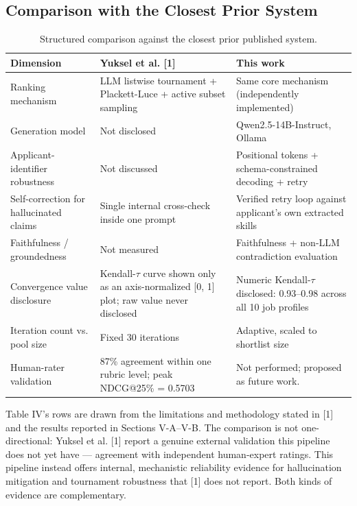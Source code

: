 \documentclass[journal]{IEEEtran}
\begin{document}
\subsection{Comparison with the Closest Prior System}
\begin{table}[!t]
\caption{Structured comparison against the closest prior published system.}
\label{tab_comparison}
\centering
\footnotesize
\begin{tabular}{p{1.5in}p{2.5in}p{2.5in}}
\hline
Dimension & Yuksel et al. [1] & This work\\
\hline
Ranking mechanism & LLM listwise tournament + Plackett-Luce + active subset sampling & Same core mechanism (independently implemented)\\
Generation model & Not disclosed & Qwen2.5-14B-Instruct, Ollama\\
Applicant-identifier robustness & Not discussed & Positional tokens + schema-constrained decoding + retry\\
Self-correction for hallucinated claims & Single internal cross-check inside one prompt & Verified retry loop against applicant's own extracted skills\\
Faithfulness / groundedness & Not measured & Faithfulness + non-LLM contradiction evaluation\\
Convergence value disclosure & Kendall-$\tau$ curve shown only as an axis-normalized [0, 1] plot; raw value never disclosed & Numeric Kendall-$\tau$ disclosed: 0.93--0.98 across all 10 job profiles\\
Iteration count vs. pool size & Fixed 30 iterations & Adaptive, scaled to shortlist size\\
Human-rater validation & 87\% agreement within one rubric level; peak NDCG@25\% = 0.5703 & Not performed; proposed as future work.\\
\hline
\end{tabular}
\end{table}

Table IV's rows are drawn from the limitations and methodology stated in [1] and the results reported in Sections V-A--V-B. The comparison is not one-directional: Yuksel et al. [1] report a genuine external validation this pipeline does not yet have --- agreement with independent human-expert ratings. This pipeline instead offers internal, mechanistic reliability evidence for hallucination mitigation and tournament robustness that [1] does not report. Both kinds of evidence are complementary.
\end{document}
